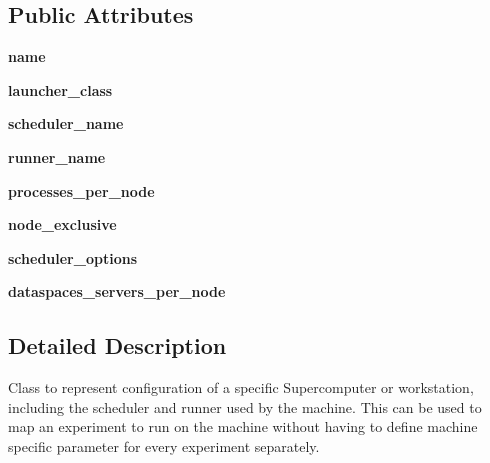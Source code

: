 \subsection*{Public Attributes}
\begin{DoxyCompactItemize}
\item 
\mbox{\label{classcodar_1_1cheetah_1_1machines_1_1_machine_abef9250525f8b50f276ccd1bec691a4d}} 
{\bfseries name}
\item 
\mbox{\label{classcodar_1_1cheetah_1_1machines_1_1_machine_a2dd9e1391e3ce96631b50ff10be0c77c}} 
{\bfseries launcher\+\_\+class}
\item 
\mbox{\label{classcodar_1_1cheetah_1_1machines_1_1_machine_a143e26d9ce57978a889e36e080ab1dab}} 
{\bfseries scheduler\+\_\+name}
\item 
\mbox{\label{classcodar_1_1cheetah_1_1machines_1_1_machine_a5b5137ed73b8b98d1623ff8a54874bc8}} 
{\bfseries runner\+\_\+name}
\item 
\mbox{\label{classcodar_1_1cheetah_1_1machines_1_1_machine_a819d751c0d97a51ccf2d70442ef0b0dc}} 
{\bfseries processes\+\_\+per\+\_\+node}
\item 
\mbox{\label{classcodar_1_1cheetah_1_1machines_1_1_machine_a63859e8502c0821712e8b7f7e48e3661}} 
{\bfseries node\+\_\+exclusive}
\item 
\mbox{\label{classcodar_1_1cheetah_1_1machines_1_1_machine_ab49f6353a7dc41ec896d64eb65986174}} 
{\bfseries scheduler\+\_\+options}
\item 
\mbox{\label{classcodar_1_1cheetah_1_1machines_1_1_machine_a6644e1dfedbb92a70c303c832e86989c}} 
{\bfseries dataspaces\+\_\+servers\+\_\+per\+\_\+node}
\end{DoxyCompactItemize}


\subsection{Detailed Description}
\begin{DoxyVerb}Class to represent configuration of a specific Supercomputer or
workstation, including the scheduler and runner used by the machine.
This can be used to map an experiment to run on the machine without
having to define machine specific parameter for every experiment
separately.\end{DoxyVerb}
 

